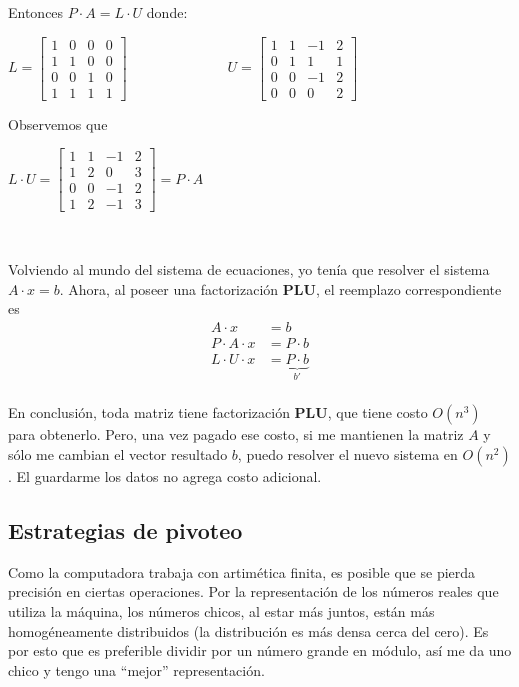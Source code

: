 \documentclass[]{article}
\begin{document}
Entonces $P\cdot A = L\cdot U$ donde:
\begin{center}
	$L = \begin{bmatrix}
		1&0&0&0\\
		1&1&0&0\\
		0&0&1&0\\
		1&1&1&1
	\end{bmatrix}\hspace{3cm} U = \begin{bmatrix}
		1&1&-1&2\\
		0&1&1&1\\
		0&0&-1&2\\
		0&0&0&2
	\end{bmatrix}$
\end{center}

Observemos que
\begin{center}
	$L\cdot U = \begin{bmatrix}
		1&1&-1&2\\
		1&2&0&3\\
		0&0&-1&2\\
		1&2&-1&3
	\end{bmatrix} = P\cdot A$
\end{center}


~\newline

Volviendo al mundo del sistema de ecuaciones, yo tenía que resolver el sistema $A\cdot x = b$. Ahora, al poseer una factorización \textbf{PLU}, el reemplazo correspondiente es
\begin{align*}
	A\cdot x &= b\\
	P\cdot A \cdot x &= P\cdot b\\
	L\cdot U \cdot x &= \underbrace{P\cdot b}_{b'}\\
\end{align*}

En conclusión, toda matriz tiene factorización \textbf{PLU}, que tiene costo $O(n^3)$ para obtenerlo. Pero, una vez pagado ese costo, si me mantienen la matriz $A$ y sólo me cambian el vector resultado $b$, puedo resolver el nuevo sistema en $O(n^2)$. El guardarme los datos no agrega costo adicional.

\subsection{Estrategias de pivoteo}
Como la computadora trabaja con artimética finita, es posible que se pierda precisión en ciertas operaciones. Por la representación de los números reales que utiliza la máquina, los números chicos, al estar más juntos, están más homogéneamente distribuidos (la distribución es más densa cerca del cero). Es por esto que es preferible dividir por un número grande en módulo, así me da uno chico y tengo una ``mejor'' representación.
\end{document}

